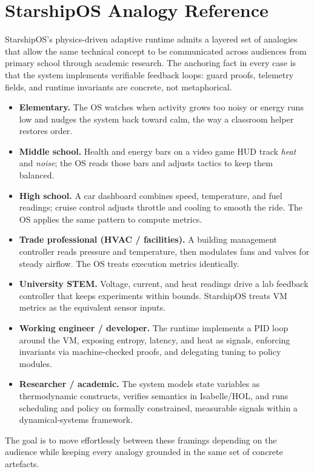
\section{StarshipOS Analogy Reference}

StarshipOS's physics-driven adaptive runtime admits a layered set of analogies that
allow the same technical concept to be communicated across audiences from primary school
through academic research. The anchoring fact in every case is that the system implements
verifiable feedback loops: guard proofs, telemetry fields, and runtime invariants are
concrete, not metaphorical.

\begin{itemize}
  \item \textbf{Elementary.} The OS watches when activity grows too noisy or energy runs
        low and nudges the system back toward calm, the way a classroom helper restores
        order.
  \item \textbf{Middle school.} Health and energy bars on a video game HUD track
        \emph{heat} and \emph{noise}; the OS reads those bars and adjusts tactics to
        keep them balanced.
  \item \textbf{High school.} A car dashboard combines speed, temperature, and fuel
        readings; cruise control adjusts throttle and cooling to smooth the ride. The OS
        applies the same pattern to compute metrics.
  \item \textbf{Trade professional (HVAC / facilities).} A building management controller
        reads pressure and temperature, then modulates fans and valves for steady airflow.
        The OS treats execution metrics identically.
  \item \textbf{University STEM.} Voltage, current, and heat readings drive a lab
        feedback controller that keeps experiments within bounds. StarshipOS treats VM
        metrics as the equivalent sensor inputs.
  \item \textbf{Working engineer / developer.} The runtime implements a PID loop around
        the VM, exposing entropy, latency, and heat as signals, enforcing invariants via
        machine-checked proofs, and delegating tuning to policy modules.
  \item \textbf{Researcher / academic.} The system models state variables as
        thermodynamic constructs, verifies semantics in Isabelle/HOL, and runs scheduling
        and policy on formally constrained, measurable signals within a dynamical-systems
        framework.
\end{itemize}

The goal is to move effortlessly between these framings depending on the audience while
keeping every analogy grounded in the same set of concrete artefacts.
